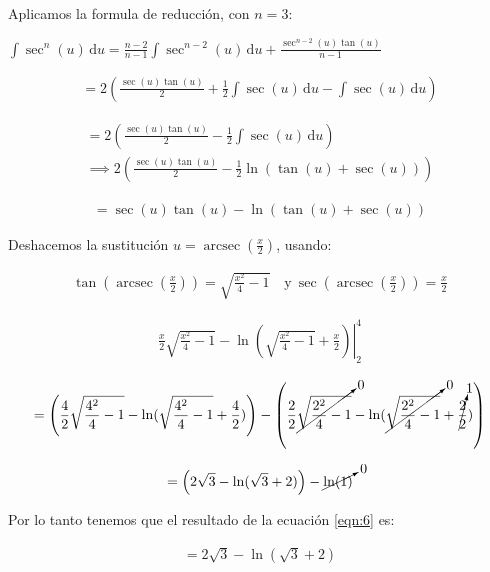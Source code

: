 \documentclass[12pt]{article}
\DeclareMathOperator{\arcsec}{arcsec}
\begin{document}
\noindent Aplicamos la formula de reducción, con $n=3$:

\begin{center}
	$\int \sec^n(u)\, \mathrm{d}u = \frac{n-2}{n-1} \int \sec^{n-2}(u)\, \mathrm{d}u + \frac{\sec^{n-2}(u)\tan(u)}{n-1}$
\end{center}

\begin{align*}
	= 2\left(\frac{\sec(u)\tan(u)}{2} + \frac{1}{2} \int \sec(u)\, \mathrm{d}u - \int \sec(u)\, \mathrm{d}u\right)
\end{align*}

\begin{multline*}
	= 2\left(\frac{\sec(u)\tan(u)}{2} - \frac{1}{2}\int \sec(u)\, \mathrm{d}u\right) \\\implies 2\left(\frac{\sec(u)\tan(u)}{2} - \frac{1}{2}\ln(\tan(u)+\sec(u))\right)
\end{multline*}

\begin{align*}
	= \sec(u)\tan(u) - \ln(\tan(u)+\sec(u))
\end{align*}

\noindent Deshacemos la sustitución $u = \arcsec(\frac{x}{2})$, usando:

\begin{align*}
	\tan\left(\arcsec\left(\frac{x}{2}\right)\right)=\sqrt{\frac{x^2}{4}-1}\quad \mathrm{y} \
	\sec\left(\arcsec\left(\frac{x}{2}\right)\right)=\frac{x}{2}
\end{align*}

\begin{align*}
	\left.\frac{x}{2}\sqrt{\frac{x^2}{4}-1}-\ln\left(\sqrt{\frac{x^2}{4}-1}+\frac{x}{2}\right)\right|_2^4
\end{align*}

\begin{align*}
	=\left(\frac{4}{2}\sqrt{\frac{4^2}{4}-1} - \ln(\sqrt{\frac{4^2}{4}-1}+\frac{4}{2})\right) - \left(\frac{2}{2}\cancelto{0}{\sqrt{\frac{2^2}{4}-1}} - \ln(\cancelto{0}{\sqrt{\frac{2^2}{4}-1}}+\cancelto{1}{\frac{2}{2}})\right)
\end{align*}

\begin{align*}
	=\left(2\sqrt{3} - \ln(\sqrt{3}+2)\right) - \cancelto{0}{\ln(1)}
\end{align*}

\noindent Por lo tanto tenemos que el resultado de la ecuación \eqref{eqn:6} es:

\begin{align*}
	=2\sqrt{3} - \ln(\sqrt{3}+2)
\end{align*}
\end{document}
